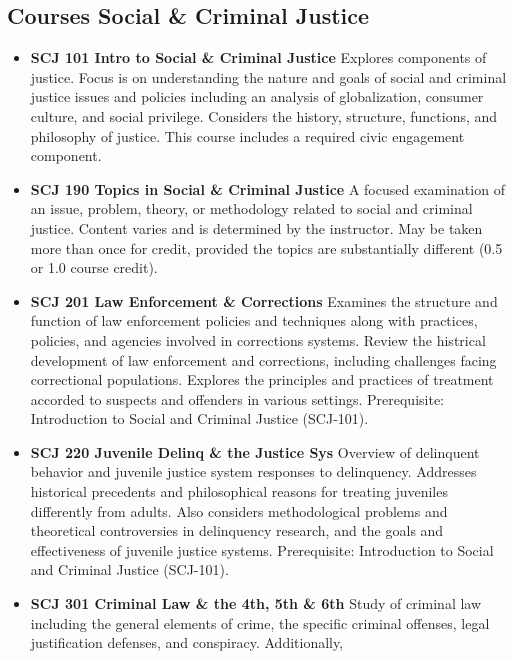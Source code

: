 \documentclass[
  letterpaper,
]{scrbook}
\providecommand{\tightlist}{%
  \setlength{\itemsep}{0pt}\setlength{\parskip}{0pt}}
\begin{document}
\subsection{Courses Social \& Criminal
Justice}\label{courses-social-criminal-justice}

\begin{itemize}
\tightlist
\item
  \textbf{SCJ 101 Intro to Social \& Criminal Justice} Explores
  components of justice. Focus is on understanding the nature and goals
  of social and criminal justice issues and policies including an
  analysis of globalization, consumer culture, and social privilege.
  Considers the history, structure, functions, and philosophy of
  justice. This course includes a required civic engagement component.\\
\item
  \textbf{SCJ 190 Topics in Social \& Criminal Justice} A focused
  examination of an issue, problem, theory, or methodology related to
  social and criminal justice. Content varies and is determined by the
  instructor. May be taken more than once for credit, provided the
  topics are substantially different (0.5 or 1.0 course credit).
\item
  \textbf{SCJ 201 Law Enforcement \& Corrections} Examines the structure
  and function of law enforcement policies and techniques along with
  practices, policies, and agencies involved in corrections systems.
  Review the histrical development of law enforcement and corrections,
  including challenges facing correctional populations. Explores the
  principles and practices of treatment accorded to suspects and
  offenders in various settings. Prerequisite: Introduction to Social
  and Criminal Justice (SCJ-101).\\
\item
  \textbf{SCJ 220 Juvenile Delinq \& the Justice Sys} Overview of
  delinquent behavior and juvenile justice system responses to
  delinquency. Addresses historical precedents and philosophical reasons
  for treating juveniles differently from adults. Also considers
  methodological problems and theoretical controversies in delinquency
  research, and the goals and effectiveness of juvenile justice systems.
  Prerequisite: Introduction to Social and Criminal Justice (SCJ-101).
\item
  \textbf{SCJ 301 Criminal Law \& the 4th, 5th \& 6th} Study of criminal
  law including the general elements of crime, the specific criminal
  offenses, legal justification defenses, and conspiracy. Additionally,

\end{itemize}
\end{document}
